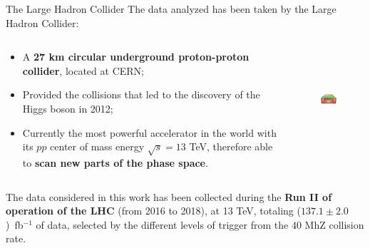 \documentclass[8pt]{beamer}
\begin{document}
\begin{frame}{The Large Hadron Collider}
\justifying
The data analyzed \alert{has been taken by the Large Hadron Collider}:

\begin{columns}
	\begin{column}{0.55	\textwidth}
	\begin{itemize}
\justifying
\item A \textbf{27 km circular underground proton-proton collider}, located at CERN;
\item Provided the collisions that led to the discovery of the Higgs boson in 2012;%
\item Currently the most powerful accelerator in the world with its $pp$ center of mass energy $\sqrt{s} = 13$ TeV, therefore able to \textbf{scan new parts of the phase space}.
\end{itemize}
	\end{column}
	\begin{column}{0.48\textwidth}
	\begin{figure}[htbp]
\begin{center}
\includegraphics[width=5cm, height=3.6cm]{figs/LHCunderground.png}
\end{center}
\end{figure}
	\end{column}
\end{columns} \vfill

\vspace{10pt}
The data considered in this work has been collected during the \textbf{Run II of operation of the LHC} (from 2016 to 2018), at 13 TeV, totaling ($137.1 \pm 2.0$)~fb$^{-1}$ of data, selected by the different levels of trigger from the 40 MhZ collision rate. \vfill
\end{frame} 
\end{document}
